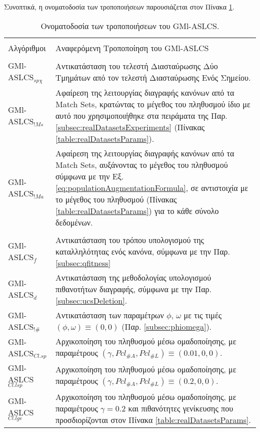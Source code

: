 Συνοπτικά, η ονοματοδοσία των τροποποιήσεων παρουσιάζεται στον Πίνακα \ref{tbl:variationsNames}.


\begin{table}[!h]
\begin{center}
    \caption{Ονοματοδοσία των τροποποιήσεων του GMl-ASLCS.}
	\label{tbl:variationsNames}
    \begin{tabular}{|l | p{12cm}|}
    \hline \\ [-2ex] 
    Αλγόριθμοι           & Αναφερόμενη Τροποποίηση του GMl-ASLCS     \\ \hline \\ [-2ex]
    GMl-ASLCS$_{sp\chi}$  & Αντικατάσταση του τελεστή Διασταύρωσης Δύο Τμημάτων από τον τελεστή Διασταύρωσης Ενός Σημείου.\\ \hline
    GMl-ASLCS$_{!Ms}$    & Αφαίρεση της λειτουργίας διαγραφής κανόνων από τα Match Sets, κρατώντας το μέγεθος του πληθυσμού ίδιο με αυτό που χρησιμοποιήθηκε στα πειράματα της Παρ. \ref{subsec:realDatasetsExperiments} (Πίνακας \ref{table:realDatasetsParams}).\\ \hline
    GMl-ASLCS$_{!Ma}$    & Αφαίρεση της λειτουργίας διαγραφής κανόνων από τα Match Sets, αυξάνοντας το μέγεθος του πληθυσμού σύμφωνα με την Εξ. \ref{eq:populationAugmentationFormula}, σε αντιστοιχία με το μέγεθος του πληθυσμού (Πίνακας \ref{table:realDatasetsParams}) για το κάθε σύνολο δεδομένων.\\ \hline  \hline \\ [-2ex]
    GMl-ASLCS$_{f}$  &  Αντικατάσταση του τρόπου υπολογισμού της καταλληλότητας ενός κανόνα, σύμφωνα με την Παρ. \ref{subsec:qfitness}\\ \hline
    GMl-ASLCS$_{d}$  &   Αντικατάσταση της μεθοδολογίας υπολογισμού πιθανοτήτων διαγραφής, σύμφωνα με την Παρ. \ref{subsec:ucsDeletion}. \\ \hline
    GMl-ASLCS$_{!\#}$  &  Αντικατάσταση των παραμέτρων $\phi$, $\omega$ με τις τιμές $(\phi, \omega) \equiv (0,0)$ (Παρ. \ref{subsec:phiomega}). \\ \hline
    GMl-ASLCS$_{Cl.sp}$  & Αρχικοποίηση του πληθυσμού μέσω ομαδοποίησης, με παραμέτρους $(\gamma, Pcl_{\#A}, Pcl_{\#L}) \equiv (0.01,0,0)$.\\ \hline
    GMl-ASLCS$_{Cl.lsp}$ & Αρχικοποίηση του πληθυσμού μέσω ομαδοποίησης, με παραμέτρους $(\gamma, Pcl_{\#A}, Pcl_{\#L}) \equiv (0.2,0,0)$.\\ \hline
    GMl-ASLCS$_{Cl.lge}$ & Αρχικοποίηση του πληθυσμού μέσω ομαδοποίησης, με παραμέτρους $\gamma=0.2$ και πιθανότητες γενίκευσης που προσδιορίζονται στον Πίνακα \ref{table:realDatasetsParams}.
    
        \\ \hline
    \end{tabular}
        \end{center}

\end{table}




